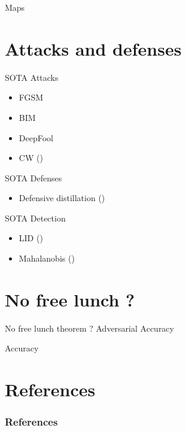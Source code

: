 \documentclass{beamer}
\begin{document}
\begin{frame}{Maps}

\end{frame}

\section{Attacks and defenses}

\begin{frame}{SOTA Attacks}
    \begin{itemize}
        \item FGSM
        \item BIM
        \item DeepFool
        \item CW (\cite{carlini2017towards})
    \end{itemize}
\end{frame}

\begin{frame}{SOTA Defenses}
\begin{itemize}
    \item Defensive distillation (\cite{papernot2016distillation})
\end{itemize}
\end{frame}

\begin{frame}{SOTA Detection}

\begin{itemize}
    \item LID (\cite{ma2018characterizing})
    \item Mahalanobis (\cite{lee2018simple})
\end{itemize}

\end{frame}

\section{No free lunch ?}

\begin{frame}{No free lunch theorem ?}
Adversarial Accuracy

Accuracy

    \cite{dohmatob2018limitations}
\end{frame}

\section*{References}

\begin{frame}[allowframebreaks]\small
  \frametitle{References}
  \renewcommand*{\bibfont}{\footnotesize}
  \printbibliography
\end{frame}
\end{document}
